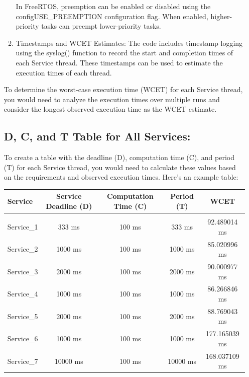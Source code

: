 \documentclass[a4paper,11pt]{article}%
\newenvironment{qanda}{\setlength{\parindent}{0pt}}{\bigskip}
\begin{document}
\begin{qanda}
\begin{enumerate}
\begin{enumerate}
				      In FreeRTOS, preemption can be enabled or disabled using the configUSE\_PREEMPTION configuration flag. When enabled, higher-priority tasks can preempt lower-priority tasks.
				\item Timestamps and WCET Estimates:
				      The code includes timestamp logging using the syslog() function to record the start and completion times of each Service thread. These timestamps can be used to estimate the execution times of each thread.
			\end{enumerate}








			To determine the worst-case execution time (WCET) for each Service thread, you would need to analyze the execution times over multiple runs and consider the longest observed execution time as the WCET estimate.

			\subsection{D, C, and T Table for All Services:}
			To create a table with the deadline (D), computation time (C), and period (T) for each Service thread, you would need to calculate these values based on the requirements and observed execution times. Here's an example table:


			\begin{table}[H]
				\centering
				\begin{tabular}{l c c c c}
					\hline
					\textbf{Service} & \textbf{Service	Deadline (D)} & \textbf{Computation Time (C)} & \textbf{Period (T)} & \textbf{WCET} \\\hline
					                 &                              &                                                                     \\
					Service\_1       & 333 ms                       & 100 ms                        & 333 ms              & 92.489014 ms  \\
					Service\_2       & 1000 ms                      & 100 ms                        & 1000 ms             & 85.020996 ms  \\
					Service\_3       & 2000 ms                      & 100 ms                        & 2000 ms             & 90.000977 ms  \\
					Service\_4       & 1000 ms                      & 100 ms                        & 1000 ms             & 86.266846 ms  \\
					Service\_5       & 2000 ms                      & 100 ms                        & 2000 ms             & 88.769043 ms  \\
					Service\_6       & 1000 ms                      & 100 ms                        & 1000 ms             & 177.165039 ms \\
					Service\_7       & 10000 ms                     & 100 ms                        & 10000 ms            & 168.037109 ms \\


\end{tabular}
\end{table}
\end{enumerate}
\end{qanda}
\end{document}
